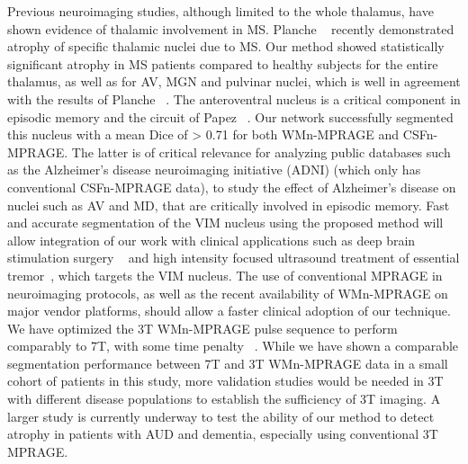 \documentclass[3p,,final,12pt]{elsarticle}
\begin{document}
Previous neuroimaging studies, although limited to the whole thalamus, have shown evidence of thalamic involvement in MS. Planche \unskip~\cite{1643371:26789959} recently demonstrated atrophy of specific thalamic nuclei due to MS. Our method showed statistically significant atrophy in MS patients compared to healthy subjects for the entire thalamus, as well as for AV, MGN and pulvinar nuclei, which is well in agreement with the results of Planche \unskip~\cite{1643371:26789959}. The anteroventral nucleus is a critical component in episodic memory and the circuit of Papez \unskip~\cite{1643371:26789934}. Our network successfully segmented this nucleus with a mean Dice of {\textgreater} 0.71 for both WMn-MPRAGE and CSFn-MPRAGE. The latter is of critical relevance for analyzing public databases such as the Alzheimer's disease neuroimaging initiative (ADNI) (which only has conventional CSFn-MPRAGE data), to study the effect of Alzheimer's disease on nuclei such as AV and MD, that are critically involved in episodic memory. Fast and accurate segmentation of the VIM nucleus using the proposed method will allow integration of our work with clinical applications such as deep brain stimulation surgery \unskip~\cite{1643371:26789937,1643371:26789916,1643371:26789943} and high intensity focused ultrasound treatment of essential tremor\unskip~\cite{1643371:26789906}, which targets the VIM nucleus. The use of conventional MPRAGE in neuroimaging protocols, as well as the recent availability of WMn-MPRAGE on major vendor platforms, should allow a faster clinical adoption of our technique. We have optimized the 3T WMn-MPRAGE pulse sequence to perform comparably to 7T, with some time penalty \unskip~\cite{1643371:26789912}. While we have shown a comparable segmentation performance between 7T and 3T WMn-MPRAGE data in a small cohort of patients in this study, more validation studies would be needed in 3T with different disease populations to establish the sufficiency of 3T imaging. A larger study is currently underway to test the ability of our method to detect atrophy in patients with AUD and dementia, especially using conventional 3T MPRAGE. 
\end{document}
